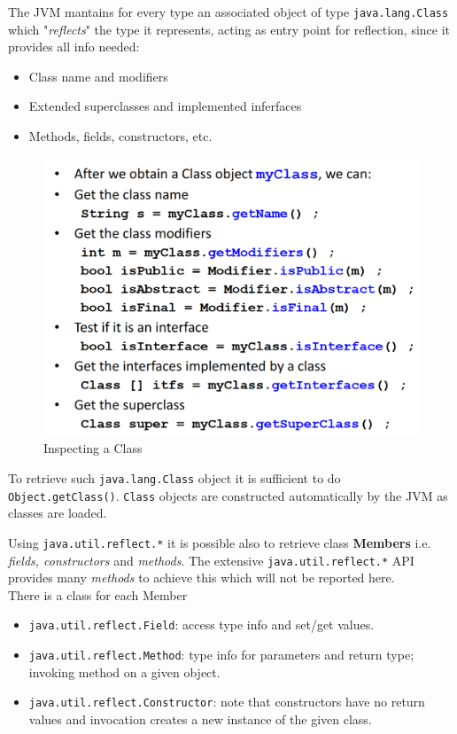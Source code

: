 \begin{paracol}{2}
    
    {The JVM mantains for every type an associated object of type \lstinline{java.lang.Class} which "\textit{reflects}" the type it represents,
    acting as entry point for reflection,
    since it provides all info needed:\ns
    \begin{itemize}
        \item Class name and modifiers
        \item Extended superclasses and implemented inferfaces
        \item Methods, fields, constructors, etc.
    \end{itemize}
    }

    \switchcolumn

    \begin{figure}[htbp]
        \centering
        \includegraphics{images/reflection_class.png}
        \caption{Inspecting a Class}
        \label{fig:reflection_class}
    \end{figure}

\end{paracol}

To retrieve such \lstinline{java.lang.Class} object it is sufficient to do \lstinline{Object.getClass()}.
\lstinline{Class} objects are constructed automatically by the JVM as classes are loaded.

Using \lstinline{java.util.reflect.*} it is possible also to retrieve class \textbf{Members} i.e. \textit{fields, constructors} and \textit{methods}.
The extensive \lstinline{java.util.reflect.*} API provides many \textit{methods} to achieve this which will not be reported here.\\
There is a class for each Member
\begin{itemize}
    \item \lstinline{java.util.reflect.Field}: access type info and set/get values.
    \item \lstinline{java.util.reflect.Method}: type info for parameters and return type;
    invoking method on a given object.
    \item \lstinline{java.util.reflect.Constructor}: note that constructors have no return values and invocation creates a new instance of the given class.
\end{itemize}


